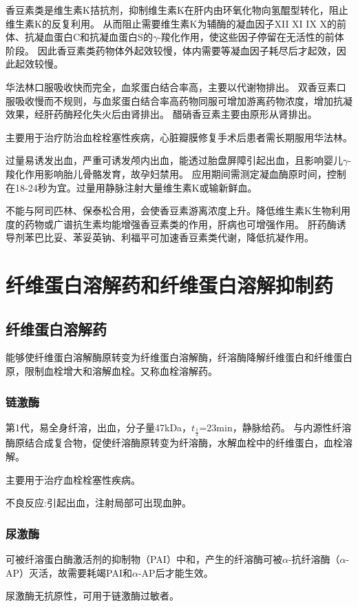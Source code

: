 \documentclass[UTF8]{ctexbook}
\begin{document}
香豆素类是维生素K拮抗剂，抑制维生素K在肝内由环氧化物向氢醌型转化，阻止维生素K的反复利用。
从而阻止需要维生素K为辅酶的凝血因子XII XI IX X的前体、抗凝血蛋白C和抗凝血蛋白S的\(\gamma\)-羧化作用，使这些因子停留在无活性的前体阶段。
因此香豆素类药物体外起效较慢，体内需要等凝血因子耗尽后才起效，因此起效较慢。

华法林口服吸收快而完全，血浆蛋白结合率高，主要以代谢物排出。
双香豆素口服吸收慢而不规则，与血浆蛋白结合率高药物同服可增加游离药物浓度，增加抗凝效果，经肝药酶羟化失火后由肾排出。
醋硝香豆素主要由原形从肾排出。

主要用于治疗防治血栓栓塞性疾病，心脏瓣膜修复手术后患者需长期服用华法林。

过量易诱发出血，严重可诱发颅内出血，能透过胎盘屏障引起出血，且影响婴儿\(\gamma\)-羧化作用影响胎儿骨骼发育，故孕妇禁用。
应用期间需测定凝血酶原时间，控制在18-24秒为宜。过量用静脉注射大量维生素K或输新鲜血。

不能与阿司匹林、保泰松合用，会使香豆素游离浓度上升。降低维生素K生物利用度的药物或广谱抗生素均能增强香豆素类的作用，肝病也可增强作用。
肝药酶诱导剂苯巴比妥、苯妥英钠、利福平可加速香豆素类代谢，降低抗凝作用。

\section{纤维蛋白溶解药和纤维蛋白溶解抑制药}
\subsection{纤维蛋白溶解药}
能够使纤维蛋白溶解酶原转变为纤维蛋白溶解酶，纤溶酶降解纤维蛋白和纤维蛋白原，限制血栓增大和溶解血栓。又称血栓溶解药。
\subsubsection{链激酶}
第1代，易全身纤溶，出血，分子量47kDa，\( t_{\frac{1}{2}} \)=23min，静脉给药。
与内源性纤溶酶原结合成复合物，促使纤溶酶原转变为纤溶酶，水解血栓中的纤维蛋白，血栓溶解。

主要用于治疗血栓栓塞性疾病。

不良反应:引起出血，注射局部可出现血肿。
\subsubsection{尿激酶}
可被纤溶蛋白酶激活剂的抑制物（PAI）中和，产生的纤溶酶可被\(\alpha\)-抗纤溶酶（\(\alpha\)-AP）灭活，故需要耗竭PAI和\(\alpha\)-AP后才能生效。

尿激酶无抗原性，可用于链激酶过敏者。
\end{document}
